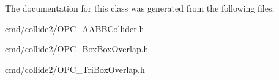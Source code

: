 The documentation for this class was generated from the following files\+:\begin{DoxyCompactItemize}
\item 
cmd/collide2/\hyperlink{OPC__AABBCollider_8h}{O\+P\+C\+\_\+\+A\+A\+B\+B\+Collider.\+h}\item 
cmd/collide2/O\+P\+C\+\_\+\+Box\+Box\+Overlap.\+h\item 
cmd/collide2/O\+P\+C\+\_\+\+Tri\+Box\+Overlap.\+h\end{DoxyCompactItemize}
